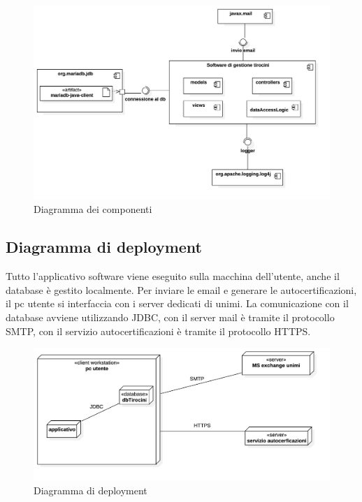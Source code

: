 \documentclass[12pt]{article}
\begin{document}
\begin{figure}[h!]
   \centering
   \includegraphics[width=\textwidth]{images/ComponentDiagram1.jpg}
   \caption*{Diagramma dei componenti}
\end{figure}

\newpage


\subsection{Diagramma di deployment}

Tutto l'applicativo software viene eseguito sulla macchina dell'utente, anche il database è gestito localmente. Per inviare le email e generare le autocertificazioni, il pc utente si interfaccia con i server dedicati di unimi. La comunicazione con il database avviene utilizzando JDBC, con il server mail è tramite il protocollo SMTP, con il servizio autocertificazioni è tramite il protocollo HTTPS.

\begin{figure}[h!]
   \centering
   \includegraphics[width=\textwidth]{images/DeploymentDiagram1.jpg}
   \caption*{Diagramma di deployment}
\end{figure}
\end{document}
